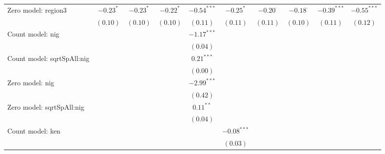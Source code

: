 \begin{table}
\begin{center}
{\begin{tabular}{l c c c c c c c c c}
Zero model: region3            & $-0.23^{*}$   & $-0.23^{*}$   & $-0.22^{*}$   & $-0.54^{***}$   & $-0.25^{*}$   & $-0.20^{\cdot}$ & $-0.18^{\cdot}$ & $-0.39^{***}$ & $-0.55^{***}$ \\
                               & $(0.10)$      & $(0.10)$      & $(0.10)$      & $(0.11)$        & $(0.11)$      & $(0.11)$        & $(0.10)$        & $(0.11)$      & $(0.12)$      \\
Count model: nig               &               &               &               & $-1.17^{***}$   &               &                 &                 &               &               \\
                               &               &               &               & $(0.04)$        &               &                 &                 &               &               \\
Count model: sqrtSpAll:nig     &               &               &               & $0.21^{***}$    &               &                 &                 &               &               \\
                               &               &               &               & $(0.00)$        &               &                 &                 &               &               \\
Zero model: nig                &               &               &               & $-2.99^{***}$   &               &                 &                 &               &               \\
                               &               &               &               & $(0.42)$        &               &                 &                 &               &               \\
Zero model: sqrtSpAll:nig      &               &               &               & $0.11^{**}$     &               &                 &                 &               &               \\
                               &               &               &               & $(0.04)$        &               &                 &                 &               &               \\
Count model: ken               &               &               &               &                 & $-0.08^{***}$ &                 &                 &               &               \\
                               &               &               &               &                 & $(0.03)$      &                 &                 &               &               \\

\end{tabular}}
\end{center}
\end{table}
